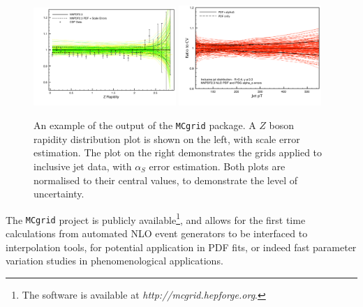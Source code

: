 \begin{figure}[ht]
\centering
\includegraphics[width=0.48\textwidth]{4-LHCtools/figs/100MDYReplicas_Scales.pdf}
\includegraphics[width=0.48\textwidth]{4-LHCtools/figs/JetsAlphas_0.pdf}
\caption[An example of the output of the {\tt MCgrid} package]{An example of the output of the {\tt MCgrid} package. A $Z$ boson rapidity distribution plot is shown on the left, with scale error estimation. The plot on the right demonstrates the grids applied to inclusive jet data, with $\alpha_S$ error estimation. Both plots are normalised to their central values, to demonstrate the level of uncertainty.}
\label{fig:MCgridreps}
\end{figure}

The {\tt MCgrid} project is publicly available\footnote{The software is available at \emph{http://mcgrid.hepforge.org}.}, and allows for the first time calculations from automated NLO event generators to be interfaced to interpolation tools, for potential application in PDF fits, or indeed fast parameter variation studies in phenomenological applications.
